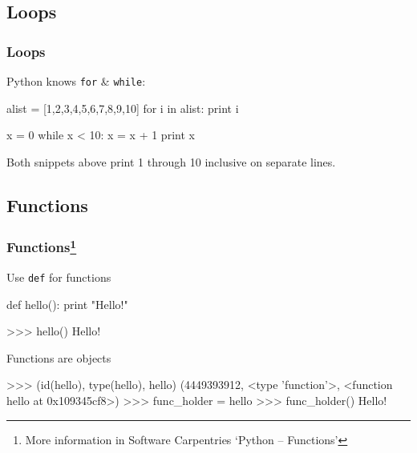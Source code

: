 \documentclass[xetex,10pt]{beamer}
\def\pythoni{\lstinline[language=pythontim]}
\begin{document}
\subsection{Loops}

\begin{frame}[fragile]
	\frametitle{Loops}
	Python knows \pythoni{for} \& \pythoni{while}:

\begin{python}
alist = [1,2,3,4,5,6,7,8,9,10]
for i in alist:
    print i
\end{python}

	\vspace*{1em}


\begin{python}
x = 0
while x < 10:
    x = x + 1
    print x
\end{python}

	\vspace*{1em}


Both snippets above print 1 through 10 inclusive on separate lines.

\end{frame}

\subsection{Functions}

\begin{frame}[fragile]
	\frametitle{Functions\footnote[frame]{More information in Software Carpentries `Python -- Functions'}}

	Use \pythoni{def} for functions

\begin{python}
def hello():
    print "Hello!"
\end{python}
\begin{python}
>>> hello()
Hello!
\end{python}

	\vspace*{1em}

Functions are objects
\begin{python}
>>> (id(hello), type(hello), hello)
(4449393912, <type 'function'>, <function hello at 0x109345cf8>)
>>> func_holder = hello
>>> func_holder()
Hello!
\end{python}
\end{frame}
\end{document}
